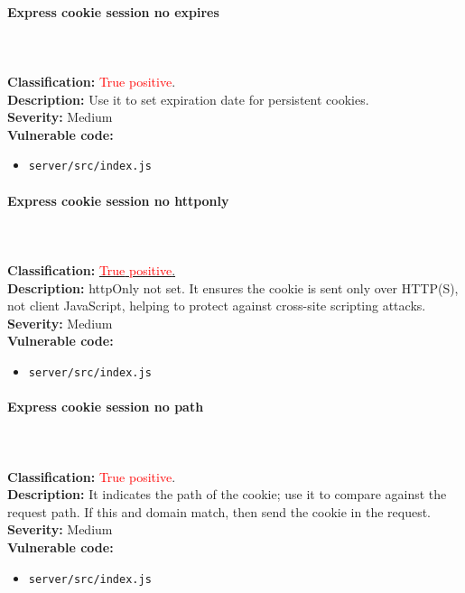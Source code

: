 \documentclass[]{article}
\begin{document}
\paragraph{Express cookie session no expires} \mbox{} \\ \\
\textbf{Classification:} {\textcolor{red}{True} \textcolor{red}{positive}.} \\
\textbf{Description:} Use it to set expiration date for persistent cookies. \\
\textbf{Severity:}  Medium\\ 
\textbf{Vulnerable code:}
\begin{itemize}
    \item \texttt{server/src/index.js}
\end{itemize}


\paragraph{Express cookie session no httponly} \mbox{} \\ \\
\textbf{Classification:} \hyperref[subsubsec:cross_site_scripting]{\textcolor{red}{True} \textcolor{red}{positive}.} \\ 
\textbf{Description:} httpOnly not set. It ensures the cookie is sent only over
          HTTP(S), not client JavaScript, helping to protect against cross-site scripting attacks. \\
\textbf{Severity:}  Medium\\ 
\textbf{Vulnerable code:}
\begin{itemize}
    \item \texttt{server/src/index.js}
\end{itemize}


\paragraph{Express cookie session no path} \mbox{} \\ \\
\textbf{Classification:} {\textcolor{red}{True} \textcolor{red}{positive}.} \\
\textbf{Description:} It indicates the path of the cookie; use it to compare against the request path. If this and domain match, then send the cookie in the request.\\
\textbf{Severity:}  Medium\\ 
\textbf{Vulnerable code:}
\begin{itemize}
    \item \texttt{server/src/index.js}
\end{itemize}
\end{document}
